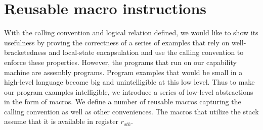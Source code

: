 \documentclass[format=acmsmall, review=true, screen=true]{acmart}
\newcommand{\var}[1]{\mathit{#1}}
\newcommand{\stk}{\var{stk}}
\newenvironment{toplas}{}{}
\newcommand{\itoplassug}[1]{}
\begin{document}
\begin{toplas}
\section{Reusable macro instructions}
\label{sec:macros}
With the calling convention and logical relation defined, we would like to show its usefulness by proving
the correctness of a series of examples that rely
on well-bracketedness and local-state encapsulation and use the calling
convention to enforce these properties. However, the programs that
run on our capability machine are assembly programs. Program examples that would
be small in a high-level language become big and unintelligible at this
low level. Thus to make our program examples intelligible, we introduce a
series of low-level abstractions in the form of macros.
We define a number of reusable macros capturing the calling convention as well
as other conveniences. The macros that utilize the stack assume that it is
available in register $r_\stk$.
\itoplassug{Lau, suggestion: should we mention temporary registers? They are
  used in the macros, but it seems like a minor technical detail.}


\end{toplas}
\end{document}
